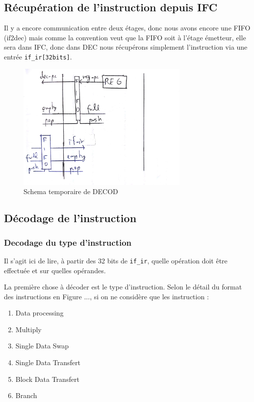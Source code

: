 \documentclass{article}
\begin{document}
\subsection{Récupération de l'instruction depuis IFC}

Il y a encore communication entre deux étages, donc nous avons encore une FIFO (if2dec)
mais comme la convention veut que la FIFO soit à l'étage émetteur, elle sera dans IFC,
donc dans DEC nous récupérons simplement l'instruction via une entrée \texttt{if\_ir[32bits]}.

\begin{figure}[H]
\includegraphics[width=0.75\textwidth]{pics/dec2.png}
\centering
\caption{Schema temporaire de DECOD}
\label{dec2}
\end{figure}


\subsection{Décodage de l'instruction}

\subsubsection{Decodage du type d'instruction}

Il s'agit ici de lire, à partir des 32 bits de \texttt{if\_ir}, quelle opération
doit être effectuée et sur quelles opérandes.

La première chose à décoder est le type d'instruction. Selon le détail du format des
instructions en Figure ..., si on ne considère que les instruction :
\begin{enumerate}
  \item Data processing
  \item Multiply
  \item Single Data Swap
  \item Single Data Transfert
  \item Block Data Transfert
  \item Branch
\end{enumerate}
\end{document}
